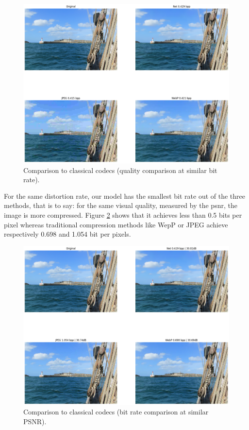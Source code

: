 \begin{figure}
    \centering
    \includegraphics[width=15cm]{img/balle_repro_2.png}
    \caption{Comparison to classical codecs (quality comparison at similar bit rate).}
    \label{balle_repro_2}
\end{figure}

For the same distortion rate, our model has the smallest bit rate out of the three methods, that is to say: for the same visual quality, measured by the \acrfull{psnr}, the image is more compressed. Figure \ref{balle_repro_3} shows that it achieves less than 0.5 bits per pixel whereas traditional compression methods like WepP or JPEG achieve respectively 0.698 and 1.054 bit per pixels.

\begin{figure}
    \centering
    \includegraphics[width=15cm]{img/balle_repro_3.png}
    \caption{Comparison to classical codecs (bit rate comparison at similar PSNR).}
    \label{balle_repro_3}
\end{figure}

